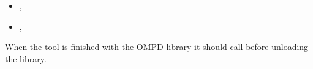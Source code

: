 \begin{comment}
\ompdsubsection{Per OpenMP Process Initialization}

An OMPD tool initializes a session working on an OpenMP process or core
file by calling \code{ompd\_process\_initialize}:

\format
\vbox{
\cspecificstart
\begin{boxedcode}
ompd_rc_t ompd_process_initialize(
  ompd_address_space_context_t  *\plc{context},
  ompd_address_space_handle_t  **\plc{handle}
);
\end{boxedcode}
	\cspecificend
}

The \code{context} argument is a pointer to the tool's context object for the address space
of the OpenMP process or core file.  The OMPD library 
returns a pointer to the address space handle in \code{*handle}, which the tool is responsible for 
releasing when it is no longer needed. This function must be called before any OMPD operations 
are performed on the OpenMP process.

\code{ompd\_process\_initialize} gives the OMPD library an opportunity to confirm that it is capable 
of handling the OpenMP process or core file identified by the \code{context}. Incompatibility is signaled by a 
return value of \code{ompd\_rc\_incompatible}. On return, the handle is owned by the tool, 
which must release it using \code{ompd\_release\_address\_space\_handle}.

\ompdsubsection{Per OpenMP Process Finalization}

When the tool is finished working on the OpenMP process address space for a process or core file, it calls
\code{ompd\_release\_address\_space\_handle}
to tell the OMPD library that it no longer needs the address space
and give the OMPD library an opportunity to release any
resources it may have related to the handle.
\end{comment}

\crossreferences
\begin{itemize}
	\item
	, 
	\item
	, 
\end{itemize}

\label{ompd:ompd_finalize}

\summary
When the tool is finished with the OMPD library it should call  before 
unloading the library.

